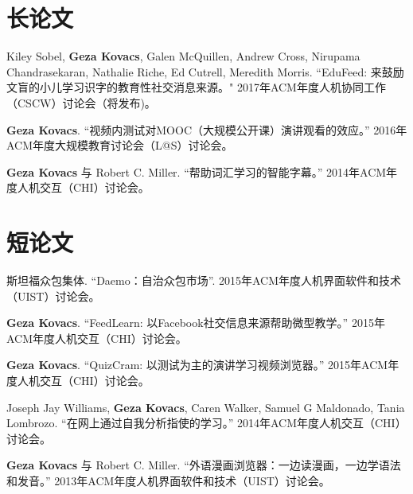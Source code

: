 \documentclass[margin,line]{resume}
\begin{document}
\begin{resume}



\section{\mysidestyle 长论文}


Kiley Sobel, \textbf{Geza Kovacs}, Galen McQuillen, Andrew Cross, Nirupama Chandrasekaran, Nathalie Riche, Ed Cutrell, Meredith Morris. ``EduFeed: 来鼓励文盲的小儿学习识字的教育性社交消息来源。" 2017年ACM年度人机协同工作（CSCW）讨论会（将发布)。

\textbf{Geza Kovacs}. ``视频内测试对MOOC（大规模公开课）演讲观看的效应。'' 2016年ACM年度大规模教育讨论会（L@S）讨论会。

\textbf{Geza Kovacs} 与 Robert C. Miller. ``帮助词汇学习的智能字幕。'' 2014年ACM年度人机交互（CHI）讨论会。


\section{\mysidestyle 短论文}

斯坦福众包集体. ``Daemo：自治众包市场''. 2015年ACM年度人机界面软件和技术（UIST）讨论会。

\textbf{Geza Kovacs}. ``FeedLearn: 以Facebook社交信息来源帮助微型教学。'' 2015年ACM年度人机交互（CHI）讨论会。

\textbf{Geza Kovacs}. ``QuizCram: 以测试为主的演讲学习视频浏览器。'' 2015年ACM年度人机交互（CHI）讨论会。

Joseph Jay Williams, \textbf{Geza Kovacs}, Caren Walker, Samuel G Maldonado, Tania Lombrozo. ``在网上通过自我分析指使的学习。'' 2014年ACM年度人机交互（CHI）讨论会。

\textbf{Geza Kovacs} 与 Robert C. Miller. ``外语漫画浏览器：一边读漫画，一边学语法和发音。''  2013年ACM年度人机界面软件和技术（UIST）讨论会。


\end{resume}
\end{document}
